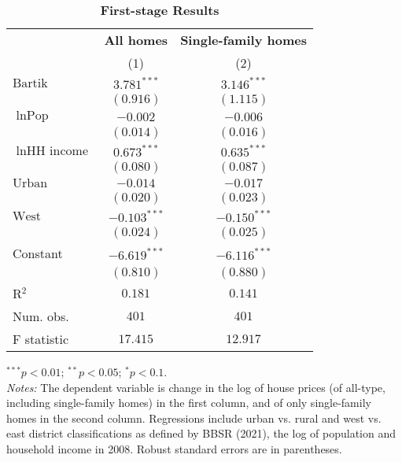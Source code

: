 
\begin{table}[H]
\caption{\textbf{First-stage Results}}
\begin{center}
\begin{footnotesize}
\begin{threeparttable}
\begin{tabular}{l c c}
\toprule
 & \multicolumn{1}{c}{\textbf{All homes}} & \multicolumn{1}{c}{\textbf{Single-family homes}} \\
\cmidrule(lr){2-2} \cmidrule(lr){3-3}
 & (1) & (2) \\
\midrule
$\text{Bartik}$         & $3.781^{***}$  & $3.146^{***}$  \\
                        & $(0.916)$      & $(1.115)$      \\
$\ln{\text{Pop}}$       & $-0.002$       & $-0.006$       \\
                        & $(0.014)$      & $(0.016)$      \\
$\ln{\text{HH income}}$ & $0.673^{***}$  & $0.635^{***}$  \\
                        & $(0.080)$      & $(0.087)$      \\
$\text{Urban}$          & $-0.014$       & $-0.017$       \\
                        & $(0.020)$      & $(0.023)$      \\
$\text{West}$           & $-0.103^{***}$ & $-0.150^{***}$ \\
                        & $(0.024)$      & $(0.025)$      \\
Constant                & $-6.619^{***}$ & $-6.116^{***}$ \\
                        & $(0.810)$      & $(0.880)$      \\
\midrule
R$^2$                   & $0.181$        & $0.141$        \\
Num. obs.               & $401$          & $401$          \\
F statistic             & $17.415$       & $12.917$       \\
\bottomrule
\end{tabular}
\begin{tablenotes}[flushleft]
\tiny{\item $^{***}p<0.01$; $^{**}p<0.05$; $^{*}p<0.1$. \\ \textit{Notes:} The dependent variable is change in the log of house prices (of all-type, including single-family homes) in the first column, and of only single-family homes in the second column. Regressions include urban vs. rural and west vs. east district classifications as defined by BBSR (2021), the log of population and household income in 2008. Robust standard errors are in parentheses.}
\end{tablenotes}
\end{threeparttable}
\end{footnotesize}
\label{tab:first-stage-results-checked}
\end{center}
\end{table}

